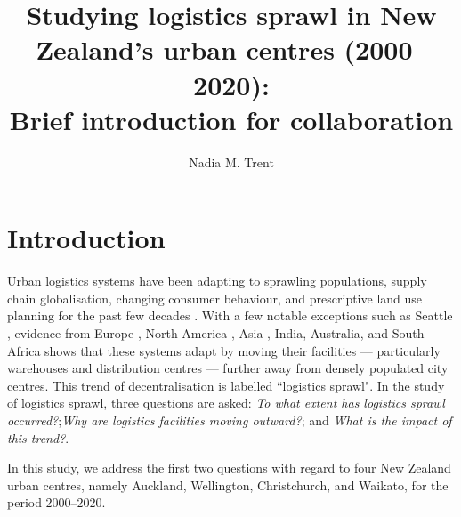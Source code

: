 \documentclass[3p, a4paper, authoryear, 11pt, fleqn, review]{elsarticle}
\title{Studying logistics sprawl in New Zealand's urban centres (2000--2020):\\ Brief introduction for collaboration}
\author[UW]{Nadia M. Trent\fnref{ead1}}
\newcommand{\nmt}[1]{{\color{Maroon}{~(nmt: #1)}}}
\begin{document}






\maketitle


\section{Introduction}
\label{sec:Intro}
\nmt{Draft from manuscript for the Journal of Transport Geography. It must be paraphrased / updated later.}

Urban logistics systems have been adapting to sprawling populations, supply chain globalisation, changing consumer behaviour, and prescriptive land use planning for the past few decades \citep{AljohaniThompson2016, He_etal2018, Sakai_etal2015, Kang2020}. With a few notable exceptions such as Seattle \citep{Dablanc_etal2014}, evidence from Europe \citep{DablancRakotonarivo2010, Kumhalova2019,Strale2020}, North America \citep{Cidell2010, Jaller_etal2017, Kang2020, Kang2020b, Kang2020c}, Asia \citep{He_etal2019, LimPark2020, Sakai_etal2015, Sakai_etal2017}, India, Australia, and South Africa \citep{CoetzeeSwanepoel2017} shows that these systems adapt by moving their facilities --- particularly warehouses and distribution centres --- further away from densely populated city centres. 
This trend of decentralisation is labelled ``logistics sprawl". In the study of logistics sprawl, three questions are asked: \emph{To what extent has logistics sprawl occurred?};\emph{Why are logistics facilities moving outward?}; and \emph{What is the impact of this trend?}. 

In this study, we address the first two questions with regard to four New Zealand urban centres, namely Auckland, Wellington, Christchurch, and Waikato, for the period 2000--2020.  
\end{document}

